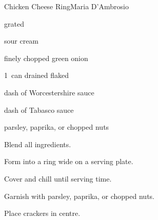 \begin{recipe}{Chicken Cheese Ring}{Maria D'Ambrosio}{}

\begin{ingredients}
\item {} 
\item {} grated 
\item \C{\quarter} sour cream
\item \C{\quarter} finely chopped green onion
\item 1~can drained flaked 
\item dash of Worcestershire sauce
\item dash of Tabasco sauce
\item parsley, paprika, or chopped nuts
\end{ingredients}

\begin{directions}
\item Blend all ingredients.
\item Form into a ring  wide on a serving plate.
\item Cover and chill until serving time.
\item Garnish with parsley, paprika, or chopped nuts.
\item Place crackers in centre.
\end{directions}

\end{recipe}
